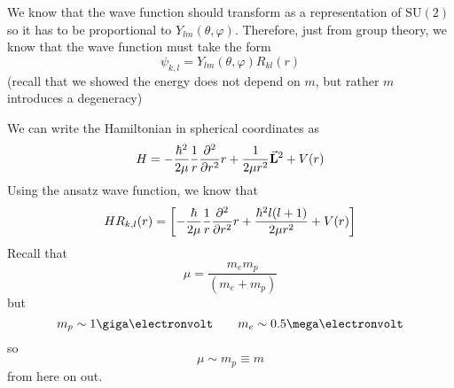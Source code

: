 \documentclass[a4paper,twoside,master.tex]{subfiles}
\begin{document}
We know that the wave function should transform as a representation of $\text{SU}(2)$ so it has to be proportional to $ Y_{lm}(\theta, \varphi) $. Therefore, just from group theory, we know that the wave function must take the form
\begin{equation}
    \psi_{k,l} = Y_{lm}(\theta, \varphi) R_{kl}(r)
\end{equation}
(recall that we showed the energy does not depend on $ m $, but rather $ m $ introduces a degeneracy)

We can write the Hamiltonian in spherical coordinates as
\begin{equation}
    H = - \frac{\hbar^2}{2 \mu} \frac{1}{r} \pdv[2]{r}r + \frac{1}{2 \mu r^2} \va{L}^2 + V(r)
\end{equation}
Using the ansatz wave function, we know that
\begin{equation}
    H R_{k,l}(r) = \left[ - \frac{\hbar}{2 \mu} \frac{1}{r} \pdv[2]{r} r + \frac{\hbar^2 l (l+1)}{2 \mu r^2} + V(r) \right]
\end{equation}
Recall that
\begin{equation}
    \mu = \frac{m_e m_p}{(m_e + m_p)}
\end{equation}
but
\begin{equation}
    m_p \sim 1\giga\electronvolt \qquad m_e \sim 0.5\mega\electronvolt
\end{equation}
so
\begin{equation}
    \mu \sim m_p \equiv m
\end{equation}
from here on out.
\end{document}
